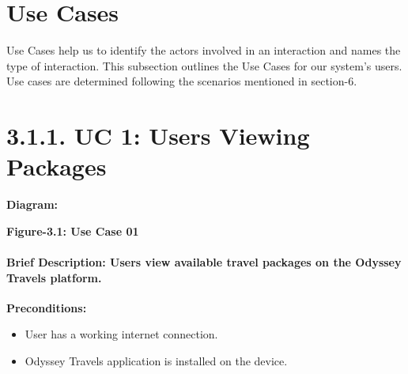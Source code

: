 \documentclass{scrreprt}
\begin{document}
\section{Use Cases}
Use Cases help us to identify the actors involved in an interaction and names the type of interaction.
This subsection outlines the Use Cases for our system’s users. Use cases are determined following
the scenarios mentioned in section-6.

\section*{\textbf{3.1.1. UC 1: Users Viewing Packages}}
\textbf{Diagram:}
\newline
\newline
\begin{center}
    \parbox{0.8\textwidth}{ 
        \centering
    }
\end{center}

\begin{center}
    \parbox{0.8\textwidth}{ 
        \centering
        \textbf{Figure-3.1: Use Case 01}
    }
\end{center}

\paragraph {\textnormal{Brief Description: 
Users view available travel packages on the Odyssey Travels platform.}}

\textbf{Preconditions:}
\begin{itemize}
    \item User has a working internet connection.
    \item Odyssey Travels application is installed on the device.
\end{itemize}
\end{document}
